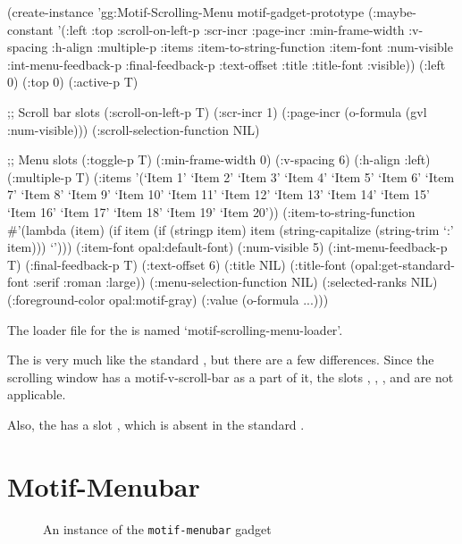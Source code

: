 \begin{programexample}
(create-instance 'gg:Motif-Scrolling-Menu motif-gadget-prototype
   (:maybe-constant '(:left :top :scroll-on-left-p
		      :scr-incr :page-incr :min-frame-width :v-spacing :h-align
		      :multiple-p :items :item-to-string-function
		      :item-font :num-visible :int-menu-feedback-p
		      :final-feedback-p :text-offset :title :title-font
		      :visible))
   (:left 0) (:top 0)
   (:active-p T)

   ;; Scroll bar slots
   (:scroll-on-left-p T)
   (:scr-incr 1)
   (:page-incr (o-formula (gvl :num-visible)))
   (:scroll-selection-function NIL)

   ;; Menu slots
   (:toggle-p T)
   (:min-frame-width 0)
   (:v-spacing 6)
   (:h-align :left)
   (:multiple-p T)
   (:items '(`Item 1' `Item 2' `Item 3' `Item 4' `Item 5' `Item 6' `Item 7'
	     `Item 8' `Item 9' `Item 10' `Item 11' `Item 12' `Item 13'
	     `Item 14' `Item 15' `Item 16' `Item 17' `Item 18' `Item 19'
	     `Item 20'))
   (:item-to-string-function
    \#'(lambda (item)
	(if item
	    (if (stringp item)
		item
		(string-capitalize (string-trim `:' item)))
	    `')))
   (:item-font opal:default-font)
   (:num-visible 5)
   (:int-menu-feedback-p T)
   (:final-feedback-p T)
   (:text-offset 6)
   (:title NIL)
   (:title-font (opal:get-standard-font :serif :roman :large))
   (:menu-selection-function NIL)
   (:selected-ranks NIL)
   (:foreground-color opal:motif-gray)
   (:value (o-formula ...)))
\end{programexample}


The loader file for the  is named
`motif-scrolling-menu-loader'.

The  is very much like
the standard , but there are a few differences.  Since the
scrolling window has a motif-v-scroll-bar as a part of it, the slots
, , , and
 are not applicable.

Also, the  has a slot , which is
absent in the standard .


\section{Motif-Menubar}
\label{motif-menubar}

\begin{figure}
\begin{center}
\end{center}
\caption{An instance of the {\tt motif-menubar} gadget}
\end{figure}

